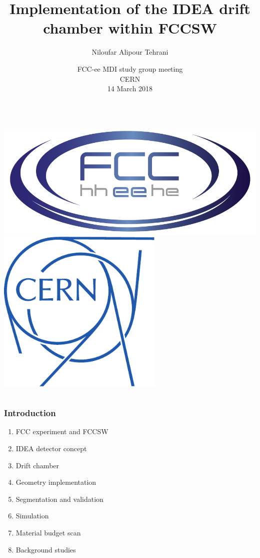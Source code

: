 \documentclass[hyperref={colorlinks=true,pdfpagelabels=false,linkcolor=black}, xcolor=dvipsnames,10pt]{beamer}
\title[]{Implementation of the IDEA drift chamber within FCCSW}
\author[Niloufar Alipour Tehrani]{Niloufar Alipour Tehrani
  \vspace{0.3cm} }
\institute[CERN]{}
\date[14 March 2018]{FCC-ee MDI study group meeting\\ \vspace{0.3cm}
  \scriptsize{CERN \\
14 March 2018}}
\renewcommand{\inserttotalframenumber}{\ref{lastframe}}
\begin{document}
\renewcommand{\inserttotalframenumber}{\pageref{lastslide}}



\begin{frame}[plain]
  
  \titlepage
  \begin{columns}
    \centering
    \includegraphics[width=\textwidth]{../logos/FCC-logo}
    \centering
    \includegraphics[width=0.6\textwidth]{../logos/logo_cern.pdf}
  \end{columns}
\end{frame}


\begin{frame}
	\frametitle{Introduction}
	
	\begin{enumerate}
	\item FCC experiment and FCCSW
	\item IDEA detector concept
	\item Drift chamber
	\item Geometry implementation
	\item Segmentation and validation
	\item Simulation
	\item Material budget scan
	\item Background studies
	\end{enumerate}
	



\end{frame}
\end{document}
